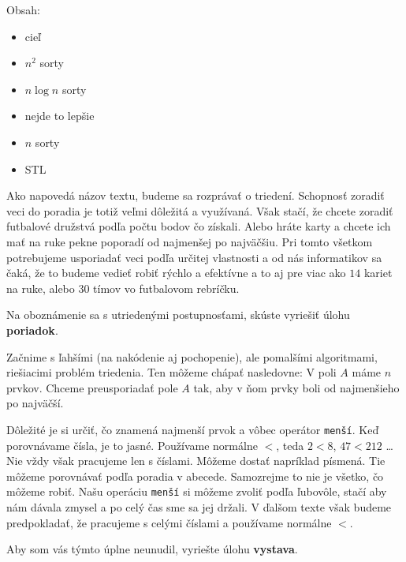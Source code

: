




Obsah:
\begin{itemize}
    \item cieľ
    \item $n^2$ sorty
    \item $n\log n$ sorty
    \item nejde to lepšie
    \item $n$ sorty
    \item STL
\end{itemize}

\medskip

Ako napovedá názov textu, budeme sa rozprávať o triedení. Schopnosť zoradiť veci do poradia je totiž
veľmi dôležitá a využívaná. Však stačí, že chcete zoradiť futbalové družstvá podľa počtu bodov čo
získali. Alebo hráte karty a chcete ich mať na ruke pekne poporadí od najmenšej po najväčšiu. Pri
tomto všetkom potrebujeme usporiadať veci podľa určitej vlastnosti a od nás informatikov sa čaká, že
to budeme vedieť robiť rýchlo a efektívne a to aj pre viac ako $14$ kariet na ruke, alebo $30$ tímov
vo futbalovom rebríčku.

\medskip

Na oboznámenie sa s utriedenými postupnosťami, skúste vyriešiť úlohu \textbf{poriadok}.


Začnime s ľahšími (na nakódenie aj pochopenie), ale pomalšími algoritmami, riešiacimi problém
triedenia. Ten môžeme chápať nasledovne: V poli $A$ máme $n$ prvkov. Chceme preusporiadať pole $A$
tak, aby v ňom prvky boli od najmenšieho po najväčší.

Dôležité je si určiť, čo znamená najmenší prvok a vôbec operátor \texttt{menší}. Keď porovnávame
čísla, je to jasné. Používame normálne $<$, teda $2<8$, $47<212$ \dots Nie vždy však pracujeme len s
číslami. Môžeme dostať napríklad písmená. Tie môžeme porovnávať podľa poradia v abecede. Samozrejme
to nie je všetko, čo môžeme robiť. Našu operáciu \texttt{menší} si môžeme zvoliť podľa ľubovôle,
stačí aby nám dávala zmysel a po celý čas sme sa jej držali. V ďalšom texte však budeme
predpokladať, že pracujeme s celými číslami a používame normálne $<$.

\medskip

Aby som vás týmto úplne neunudil, vyriešte úlohu \textbf{vystava}.

